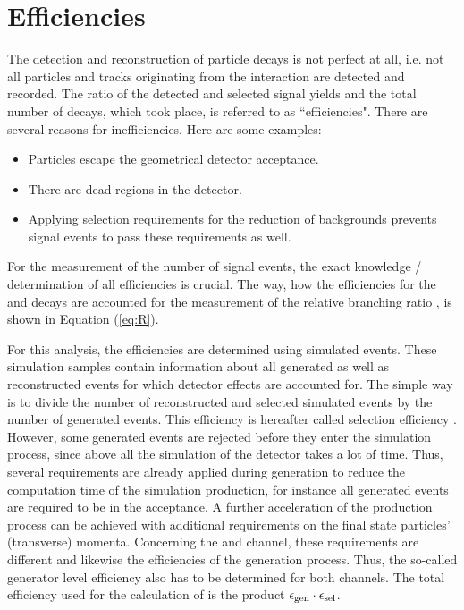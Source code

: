 \chapter{Efficiencies}
\label{sec:Efficiencies}

The detection and reconstruction of particle decays is not perfect at all, i.e. not all particles and tracks originating from the \proton\proton interaction are detected and recorded.
The ratio of the detected and selected signal yields and the total number of decays, which took place, is referred to as ``efficiencies".
There are several reasons for inefficiencies.
Here are some examples:
\begin{itemize}
    \item Particles escape the geometrical detector acceptance.
    \item There are dead regions in the detector.
    \item Applying selection requirements for the reduction of backgrounds prevents signal events to pass these requirements as well.
\end{itemize}
For the measurement of the number of signal events, the exact knowledge / determination of all efficiencies is crucial.
The way, how the efficiencies for the \LbToDpmunuX and \LbToLcmunu decays are accounted for the measurement of the relative branching ratio \R, is shown in Equation (\ref{eq:R}).

For this analysis, the efficiencies are determined using simulated events.
These simulation samples contain information about all generated as well as reconstructed events for which detector effects are accounted for.
The simple way is to divide the number of reconstructed and selected simulated events by the number of generated events. 
This efficiency is hereafter called selection efficiency \effSel.
However, some generated events are rejected before they enter the simulation process, since above all the simulation of the detector takes a lot of time. 
Thus, several requirements are already applied during generation to reduce the computation time of the simulation production, for instance all generated events are required to be in the \lhcb acceptance.
A further acceleration of the production process can be achieved with additional requirements on the final state particles' (transverse) momenta.
Concerning the \LbToDpmunuX and \LbToLcmunu channel, these requirements are different and likewise the efficiencies of the generation process.
Thus, the so-called generator level efficiency \effGen also has to be determined for both channels. 
The total efficiency used for the calculation of \R is the product $\epsilon_{\text{gen}} \cdot \epsilon_{\text{sel}}$.

